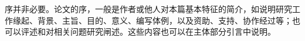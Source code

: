 \begin{Preclude}
序并非必要。论文的序，一般是作者或他人对本篇基本特征的简介，如说明研究工作缘起、背景、主旨、目的、意义、编写体例，以及资助、支持、协作经过等；也可以评述和对相关问题研究闸述。这些内容也可以在主体部分引言中说明。
\end{Preclude}

